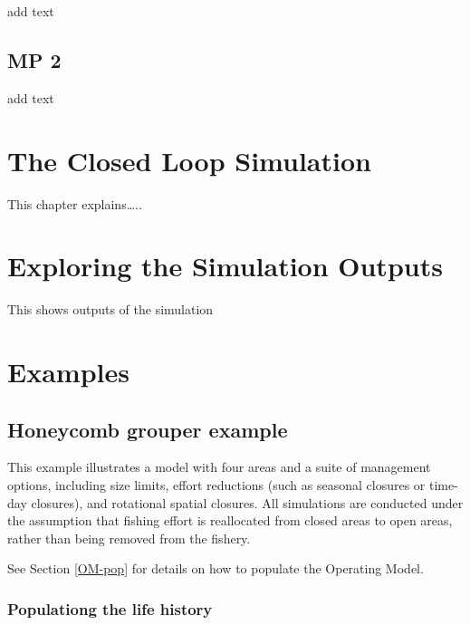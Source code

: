 \documentclass[
]{book}
\begin{document}
add text

\section{MP 2}\label{mp-2}

add text

\chapter{The Closed Loop Simulation}\label{the-closed-loop-simulation}

This chapter explains\ldots..

\chapter{Exploring the Simulation Outputs}\label{exploring-the-simulation-outputs}

This shows outputs of the simulation

\chapter{Examples}\label{examples}

\section{Honeycomb grouper example}\label{honeycomb-grouper-example}

This example illustrates a model with four areas and a suite of management options, including size limits, effort reductions (such as seasonal closures or time-day closures), and rotational spatial closures. All simulations are conducted under the assumption that fishing effort is reallocated from closed areas to open areas, rather than being removed from the fishery.

See Section \ref{OM-pop} for details on how to populate the Operating Model.

\subsection{Populationg the life history}\label{populationg-the-life-history}
\end{document}
